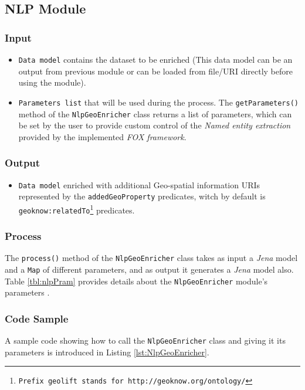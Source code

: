 \documentclass[a4paper,twoside,bibtotoc,abstracton,12pt,BCOR=15mm]{article}
\begin{document}

\subsection{NLP Module}
\subsubsection{Input}
\begin{itemize}
 \item \texttt{Data model} contains the dataset to be enriched 
 (This data model can be an output from previous module or can be loaded from file/URI directly before using the module). 
 \item \texttt{Parameters list} that will be used during the process. The \texttt{getParameters()} method of the \texttt{NlpGeoEnricher} class returns a list of parameters,
 which can be set by the user to provide custom control of the \emph{Named entity extraction} provided by the implemented \emph{FOX framework}.
\end{itemize}

\subsubsection{Output}
\begin{itemize}
 \item \texttt{Data model} enriched with additional Geo-spatial information URIs represented by the \texttt{addedGeoProperty} predicates, 
 witch by default is \texttt{geoknow:relatedTo\footnote{Prefix \texttt{geolift} stands for \texttt{http://geoknow.org/ontology/}}} predicates.
\end{itemize}

\subsubsection{Process}
The \texttt{process()} method of the \texttt{NlpGeoEnricher} class takes as input a \emph{Jena} model and a \texttt{Map} of different parameters, 
and as output it generates a \emph{Jena} model also.
Table \ref{tbl:nlpPram} provides details about the \texttt{NlpGeoEnricher} module's parameters .

\subsubsection{Code Sample}
A sample code showing how to call the \texttt{NlpGeoEnricher} class and giving it its parameters is introduced in Listing \ref{lst:NlpGeoEnricher}.
\end{document}
